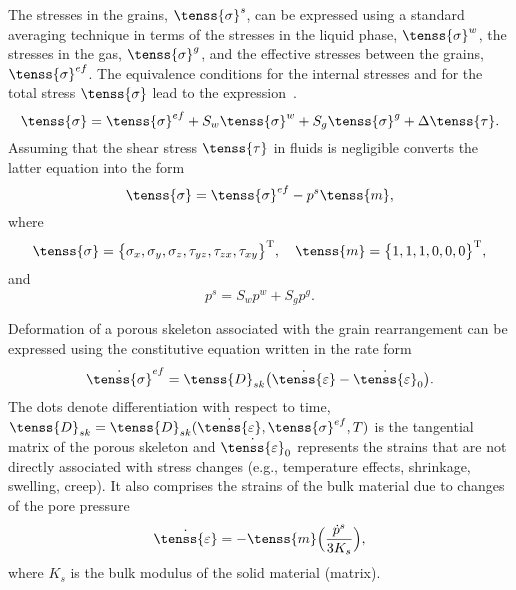 The stresses in the grains, $\tenss{\sigma}^s$, can be expressed using a standard averaging technique 
in terms of the stresses in the liquid phase, $\tenss{\sigma}^w$, the stresses in the gas, $\tenss{\sigma}^g$, 
and the effective stresses between the grains, $\tenss{\sigma}^{ef}$. The equivalence conditions for the internal 
stresses and for the total stress $\tenss{\sigma}$ lead to the expression~\cite{bitt}.
\begin{equation}\label{d3}
\tenss{\sigma} = \tenss{\sigma}^{ef} + S_w \tenss{\sigma}^w + S_g \tenss{\sigma}^g + \Delta \tenss{\tau}.
\end{equation}
Assuming that the shear stress $\tenss{\tau}$ in fluids is negligible converts the latter equation into the form
\begin{equation}\label{d4}
\tenss{\sigma} = \tenss{\sigma}^{ef} - p^s \tenss{m},
\end{equation}
where
\begin{equation}\label{d5}
\tenss{\sigma} = \big\{ \sigma_x,\sigma_y,\sigma_z,\tau_{yz},\tau_{zx},\tau_{xy}\big\}^{\rm T}, \quad
\tenss{m} = \big\{ 1,1,1,0,0,0 \big\}^{\rm T},
\end{equation}
and
\begin{equation}\label{d6}
p^s = S_w p^w + S_g p^g.
\end{equation}

Deformation of a porous skeleton associated with the grain rearrangement can be expressed using 
the constitutive equation written in the rate form
\begin{equation}\label{d7}
\dot{\tenss{\sigma}}^{ef} = \tenss{D}_{sk} \big(\dot{\tenss{\varepsilon}} - \dot{\tenss{\varepsilon}}_0 \big).
\end{equation}
The dots denote differentiation with respect to time, $\tenss{D}_{sk} = \tenss{D}_{sk}(\dot{\tenss{\varepsilon}}, 
{\tenss{\sigma}}^{ef}, T) $ is the tangential matrix of the porous skeleton and $\dot{\tenss{\varepsilon}}_0$ 
represents the strains that are not directly associated with stress changes (e.g., temperature effects, shrinkage, 
swelling, creep). It also comprises the strains of the bulk material due to changes of the pore pressure
\begin{equation}\label{d8}
\dot{\tenss{\varepsilon}} =  -\tenss{m} \Big( \frac{\dot{p}^s}{3K_s} \Big),
\end{equation}
where $K_s$ is the bulk modulus of the solid material (matrix).

